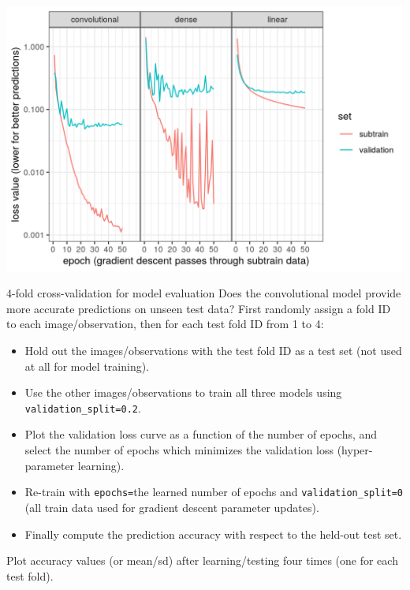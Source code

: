 \documentclass{article}
\begin{document}
\includegraphics[width=\textwidth]{figure-validation-loss-three}

{4-fold cross-validation for model evaluation}
  Does the convolutional model provide more accurate predictions on
  unseen test data? First randomly assign a fold ID to each image/observation,
  then for each test fold ID from 1 to 4:
  \begin{itemize}
  \item Hold out the images/observations with the test fold ID as a
    test set (not used at all for model training).
  \item Use the other images/observations to train all three models
    using \texttt{validation\_split=0.2}.
  \item Plot the validation loss curve as a function of the number of
    epochs, and select the number of epochs which minimizes the
    validation loss (hyper-parameter learning).
  \item Re-train with \texttt{epochs=}the learned number of epochs and
    \texttt{validation\_split=0} (all train data used for gradient
    descent parameter updates).
  \item Finally compute the prediction accuracy with respect to the
    held-out test set.
  \end{itemize}
  Plot accuracy values (or mean/sd) after learning/testing four times
  (one for each test fold).
 
\end{document}
